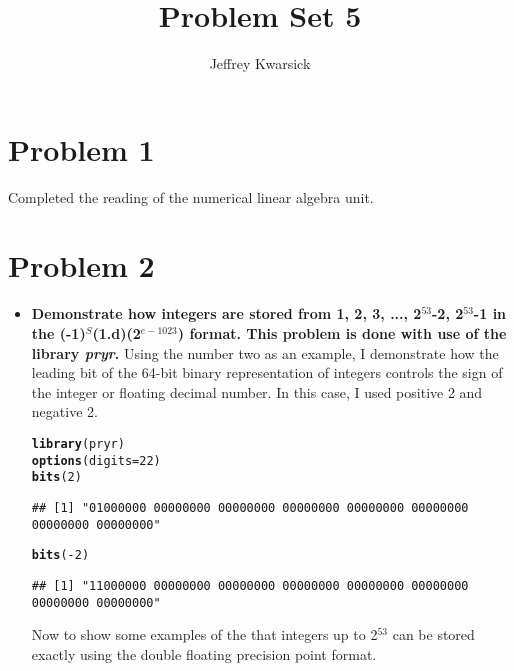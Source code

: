 \documentclass{article}\usepackage[]{graphicx}\usepackage[]{color}
\makeatletter
\newcommand{\hlnum}[1]{\textcolor[rgb]{0.686,0.059,0.569}{#1}}%
\newcommand{\hlopt}[1]{\textcolor[rgb]{0,0,0}{#1}}%
\newcommand{\hlstd}[1]{\textcolor[rgb]{0.345,0.345,0.345}{#1}}%
\newcommand{\hlkwc}[1]{\textcolor[rgb]{0.333,0.667,0.333}{#1}}%
\newcommand{\hlkwd}[1]{\textcolor[rgb]{0.737,0.353,0.396}{\textbf{#1}}}%
\newenvironment{kframe}{%
 \def\at@end@of@kframe{}%
 \ifinner\ifhmode%
  \def\at@end@of@kframe{\end{minipage}}%
  \begin{minipage}{\columnwidth}%
 \fi\fi%
 \def\FrameCommand##1{\hskip\@totalleftmargin \hskip-\fboxsep
 \colorbox{shadecolor}{##1}\hskip-\fboxsep
     \hskip-\linewidth \hskip-\@totalleftmargin \hskip\columnwidth}%
 \MakeFramed {\advance\hsize-\width
   \@totalleftmargin\z@ \linewidth\hsize
   \@setminipage}}%
 {\par\unskip\endMakeFramed%
 \at@end@of@kframe}
\newenvironment{knitrout}{}{} %
\makeatother
\begin{document}
\title{Problem Set 5}
\author{Jeffrey Kwarsick}
\maketitle
\section{Problem 1}
Completed the reading of the numerical linear algebra unit.
\section{Problem 2}
\begin{itemize}
\item \textbf{Demonstrate how integers are stored from 1, 2, 3, ..., 2$^{53}$-2, 2$^{53}$-1 in the (-1)$^S$(1.d)(2$^{e-1023}$) format.  This problem is done with use of the library \emph{pryr}.}
\subitem Using the number two as an example, I demonstrate how the leading bit of the 64-bit binary representation of integers controls the sign of the integer or floating decimal number.  In this case, I used positive 2 and negative 2.
\begin{knitrout}
\color{fgcolor}\begin{kframe}
\begin{alltt}
\hlkwd{library}\hlstd{(pryr)}
\hlkwd{options}\hlstd{(}\hlkwc{digits}\hlstd{=}\hlnum{22}\hlstd{)}
\hlkwd{bits}\hlstd{(}\hlnum{2}\hlstd{)}
\end{alltt}
\begin{verbatim}
## [1] "01000000 00000000 00000000 00000000 00000000 00000000 00000000 00000000"
\end{verbatim}
\begin{alltt}
\hlkwd{bits}\hlstd{(}\hlopt{-}\hlnum{2}\hlstd{)}
\end{alltt}
\begin{verbatim}
## [1] "11000000 00000000 00000000 00000000 00000000 00000000 00000000 00000000"
\end{verbatim}
\end{kframe}
\end{knitrout}
\subitem Now to show some examples of the that integers up to 2$^{53}$ can be stored exactly using the double floating precision point format.
\begin{knitrout}
\color{fgcolor}\begin{kframe}
\begin{alltt}

\end{alltt}
\end{kframe}
\end{knitrout}
\end{itemize}
\end{document}
